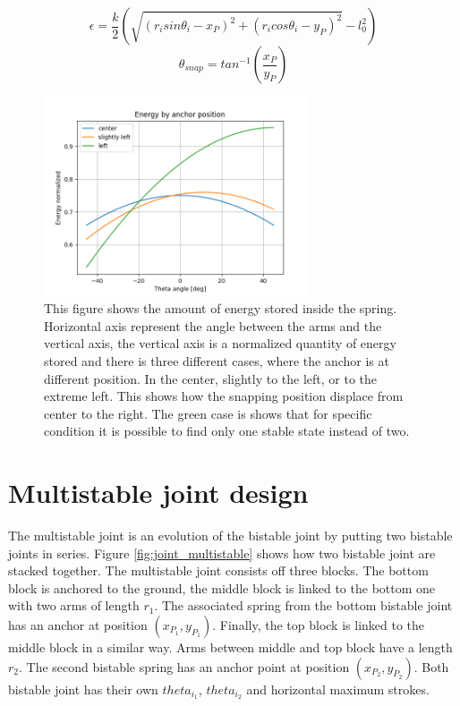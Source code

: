     \begin{equation}
        \epsilon = \frac{k}{2}\left(\sqrt{(r_i sin\theta_i - x_P)^2 + (r_i cos\theta_i - y_P)^2} - l_0^2\right)    
        \label{eq:potential_single}
    \end{equation}
    \begin{equation}
        \theta_{snap} = tan^{-1}\left(\frac{x_P}{y_P}\right)    
        \label{eq:snap_angle}
    \end{equation}
    
    \begin{figure}
        \centering
        \includegraphics[width=0.7\textwidth]{images/energy.png}
        \caption{This figure shows the amount of energy stored inside the spring. Horizontal axis represent the angle between the arms and the vertical axis, the vertical axis is a normalized quantity of energy stored and there is three different cases, where the anchor is at different position. In the center, slightly to the left, or to the extreme left. This shows how the snapping position displace from center to the right. The green case is shows that for specific condition it is possible to find only one stable state instead of two. }
        \label{fig:energy}
    \end{figure}
    
    
    
    \section{Multistable joint design}\label{sec:mutistable}
        The multistable joint is an evolution of the bistable joint by putting two bistable joints in series. Figure \ref{fig:joint_multistable} shows how two bistable joint are stacked together. The multistable joint consists off three blocks. The bottom block is anchored to the ground, the middle block is linked to the bottom one with two arms of length $r_1$. The associated spring from the bottom bistable joint has an anchor at position $(x_{P_1}, y_{P_1})$. Finally, the top block is linked to the middle block in a similar way. Arms between middle and top block have a length $r_2$. The second bistable spring has an anchor point at position $(x_{P_2}, y_{P_2})$. 
        Both bistable joint has their own $theta_{i_1}$, $theta_{i_2}$ and horizontal maximum strokes.\\
        
